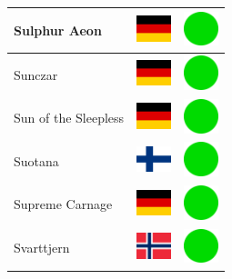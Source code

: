 \documentclass[12pt, a4paper, twoside]{report}
\begin{document}
\begin{center}
\begin{longtable}{|p{5cm}|p{2cm}|p{2cm}|}
 Sulphur Aeon                                               & \includegraphics[width=1cm]{../4x3/de} &   \includegraphics[width=1cm]{../likes/y} \\ \hline
 Sunczar                                                    & \includegraphics[width=1cm]{../4x3/de} &   \includegraphics[width=1cm]{../likes/y} \\ \hline
 Sun of the Sleepless                                       & \includegraphics[width=1cm]{../4x3/de} &   \includegraphics[width=1cm]{../likes/y} \\ \hline
 Suotana                                                    & \includegraphics[width=1cm]{../4x3/fi} &   \includegraphics[width=1cm]{../likes/y} \\ \hline
 Supreme Carnage                                            & \includegraphics[width=1cm]{../4x3/de} &   \includegraphics[width=1cm]{../likes/y} \\ \hline
 Svarttjern                                                 & \includegraphics[width=1cm]{../4x3/no} &   \includegraphics[width=1cm]{../likes/y} \\ \hline

\end{longtable}
\end{center}
\end{document}
